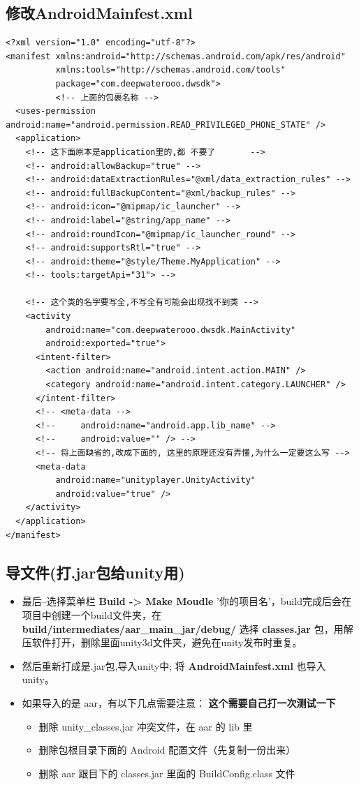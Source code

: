 \documentclass[9pt, b5paper]{article}
\begin{document}
\subsection{修改AndroidMainfest.xml}
\label{sec-2-2}
\begin{verbatim}
<?xml version="1.0" encoding="utf-8"?>
<manifest xmlns:android="http://schemas.android.com/apk/res/android"
          xmlns:tools="http://schemas.android.com/tools"
          package="com.deepwaterooo.dwsdk">
          <!-- 上面的包裹名称 -->
  <uses-permission android:name="android.permission.READ_PRIVILEGED_PHONE_STATE" />
  <application>
    <!-- 这下面原本是application里的,都 不要了       -->
    <!-- android:allowBackup="true" -->
    <!-- android:dataExtractionRules="@xml/data_extraction_rules" -->
    <!-- android:fullBackupContent="@xml/backup_rules" -->
    <!-- android:icon="@mipmap/ic_launcher" -->
    <!-- android:label="@string/app_name" -->
    <!-- android:roundIcon="@mipmap/ic_launcher_round" -->
    <!-- android:supportsRtl="true" -->
    <!-- android:theme="@style/Theme.MyApplication" -->
    <!-- tools:targetApi="31"> -->

    <!-- 这个类的名字要写全,不写全有可能会出现找不到类 -->
    <activity
        android:name="com.deepwaterooo.dwsdk.MainActivity" 
        android:exported="true">
      <intent-filter>
        <action android:name="android.intent.action.MAIN" />
        <category android:name="android.intent.category.LAUNCHER" />
      </intent-filter>
      <!-- <meta-data -->
      <!--     android:name="android.app.lib_name" -->
      <!--     android:value="" /> -->
      <!-- 将上面缺省的,改成下面的, 这里的原理还没有弄懂,为什么一定要这么写 -->
      <meta-data
          android:name="unityplayer.UnityActivity"
          android:value="true" />
    </activity>
  </application>
</manifest>
\end{verbatim}
\subsection{导文件(打.jar包给unity用)}
\label{sec-2-3}
\begin{itemize}
\item 最后–选择菜单栏 \textbf{Build -> Make Moudle} ’你的项目名’，build完成后会在项目中创建一个build文件夹，在 \textbf{build/intermediates/aar\_main\_jar/debug/} 选择 \textbf{classes.jar} 包，用解压软件打开，删除里面unity3d文件夹，避免在unity发布时重复。
\item 然后重新打成是.jar包,导入unity中; 将 \textbf{AndroidMainfest.xml} 也导入unity。
\item 如果导入的是 aar，有以下几点需要注意： \textbf{这个需要自己打一次测试一下}
\begin{itemize}
\item 删除 unity\_classes.jar 冲突文件，在 aar 的 lib 里
\item 删除包根目录下面的 Android 配置文件（先复制一份出来）
\item 删除 aar 跟目下的 classes.jar 里面的 BuildConfig.class 文件
\end{itemize}
\end{itemize}
\end{document}
